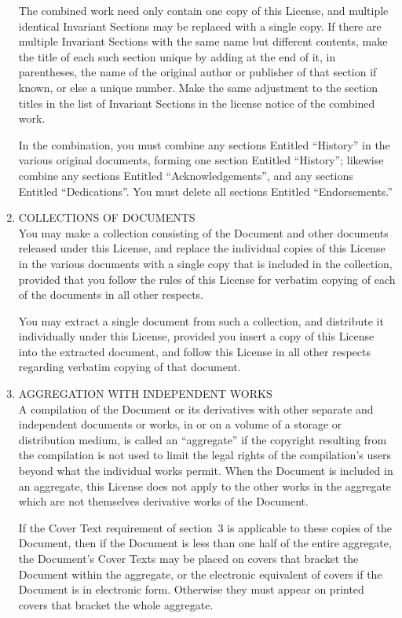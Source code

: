 \begin{enumerate}
  The combined work need only contain one copy of this License, and
  multiple identical Invariant Sections may be replaced with a single
  copy.  If there are multiple Invariant Sections with the same name
  but different contents, make the title of each such section unique
  by adding at the end of it, in parentheses, the name of the original
  author or publisher of that section if known, or else a unique
  number.  Make the same adjustment to the section titles in the list
  of Invariant Sections in the license notice of the combined work.

  In the combination, you must combine any sections Entitled
  ``History'' in the various original documents, forming one section
  Entitled ``History''; likewise combine any sections Entitled
  ``Acknowledgements'', and any sections Entitled ``Dedications''.
  You must delete all sections Entitled ``Endorsements.''

\item COLLECTIONS OF DOCUMENTS \\
  You may make a collection consisting of the Document and other
  documents released under this License, and replace the individual
  copies of this License in the various documents with a single copy
  that is included in the collection, provided that you follow the
  rules of this License for verbatim copying of each of the documents
  in all other respects.

  You may extract a single document from such a collection, and
  distribute it individually under this License, provided you insert a
  copy of this License into the extracted document, and follow this
  License in all other respects regarding verbatim copying of that
  document.

\item AGGREGATION WITH INDEPENDENT WORKS \\
  A compilation of the Document or its derivatives with other separate
  and independent documents or works, in or on a volume of a storage
  or distribution medium, is called an ``aggregate'' if the copyright
  resulting from the compilation is not used to limit the legal rights
  of the compilation's users beyond what the individual works permit.
  When the Document is included in an aggregate, this License does not
  apply to the other works in the aggregate which are not themselves
  derivative works of the Document.

  If the Cover Text requirement of section~3 is applicable to these
  copies of the Document, then if the Document is less than one half
  of the entire aggregate, the Document's Cover Texts may be placed on
  covers that bracket the Document within the aggregate, or the
  electronic equivalent of covers if the Document is in electronic
  form.  Otherwise they must appear on printed covers that bracket the
  whole aggregate.


\end{enumerate}
